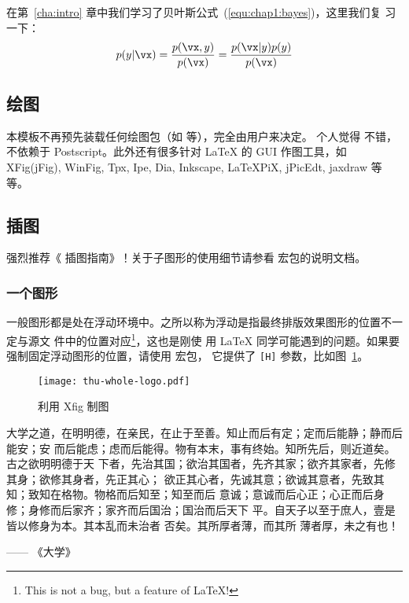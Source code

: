 在第~\ref{cha:intro} 章中我们学习了贝叶斯公式~(\ref{equ:chap1:bayes})，这里我们复
习一下：
\begin{equation}
\label{equ:chap2:bayes}
p(y|\vx) = \frac{p(\vx,y)}{p(\vx)}=
\frac{p(\vx|y)p(y)}{p(\vx)}
\end{equation}

\subsection{绘图}
\label{sec:draw}

本模板不再预先装载任何绘图包（如  等），完全由用户来决定。
个人觉得  不错，不依赖于 Postscript。此外还有很多针对 \LaTeX{} 的
 GUI 作图工具，如 XFig(jFig), WinFig, Tpx, Ipe, Dia, Inkscape, LaTeXPiX,
jPicEdt, jaxdraw 等等。

\subsection{插图}
\label{sec:graphs}

强烈推荐《\LaTeXe{} 插图指南》！关于子图形的使用细节请参看  宏包的说明文档。

\subsubsection{一个图形}
\label{sec:onefig}
一般图形都是处在浮动环境中。之所以称为浮动是指最终排版效果图形的位置不一定与源文
件中的位置对应\footnote{This is not a bug, but a feature of \LaTeX!}，这也是刚使
用 \LaTeX{} 同学可能遇到的问题。如果要强制固定浮动图形的位置，请使用  宏包，
它提供了 \texttt{[H]} 参数，比如图~\ref{fig:xfig1}。
\begin{figure}[H] %
  \centering
  \texttt{[image: thu-whole-logo.pdf]}
  \caption{利用 Xfig 制图}
  \label{fig:xfig1}
\end{figure}

大学之道，在明明德，在亲民，在止于至善。知止而后有定；定而后能静；静而后能安；安
而后能虑；虑而后能得。物有本末，事有终始。知所先后，则近道矣。古之欲明明德于天
下者，先治其国；欲治其国者，先齐其家；欲齐其家者，先修其身；欲修其身者，先正其心；
欲正其心者，先诚其意；欲诚其意者，先致其知；致知在格物。物格而后知至；知至而后
意诚；意诚而后心正；心正而后身 修；身修而后家齐；家齐而后国治；国治而后天下
平。自天子以至于庶人，壹是皆以修身为本。其本乱而未治者 否矣。其所厚者薄，而其所
薄者厚，未之有也！

\hfill —— 《大学》


